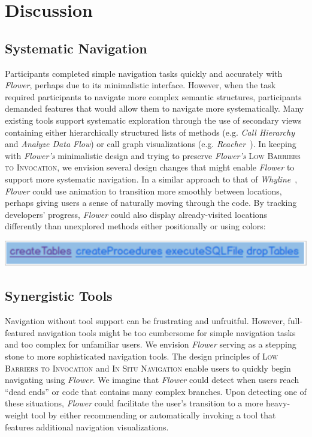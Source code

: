 \documentclass[conference]{IEEEtran}
\begin{document}
\section{Discussion}

\subsection{Systematic Navigation}
Participants completed simple navigation tasks quickly and accurately with \textit{Flower}, perhaps due to its minimalistic interface.
However, when the task required participants to navigate more complex semantic structures, participants demanded features that would allow them to navigate more systematically.
Many existing tools support systematic exploration through the use of secondary views containing either hierarchically structured lists of methods (e.g. \textit{Call Hierarchy} and \textit{Analyze Data Flow}) or call graph visualizations (e.g. \textit{Reacher~\cite{Reacher}}).
In keeping with \textit{Flower's} minimalistic design and trying to preserve \textit{Flower's} \textsc{Low Barriers to Invocation}, we envision several design changes that might enable \textit{Flower}  to support more systematic navigation.
In a similar approach to that of \emph{Whyline}~\cite{Whyline}, \textit{Flower}  could use animation to transition more smoothly between locations, perhaps giving users a sense of naturally moving through the code.
By tracking developers' progress, \textit{Flower} could also display already-visited locations differently than unexplored methods either positionally or using colors:

\noindent\includegraphics[width=\columnwidth]{images/HyperlinkColoring}



\subsection{Synergistic Tools}
Navigation without tool support can be frustrating and unfruitful.
However, full-featured navigation tools might be too cumbersome for simple navigation tasks and too complex for unfamiliar users.
We envision \textit{Flower} serving as a stepping stone to more sophisticated navigation tools. 
The design principles of \textsc{Low Barriers to Invocation} and \textsc{In Situ Navigation} enable users to quickly begin navigating using \textit{Flower}. 
We imagine that \textit{Flower} could detect when users reach ``dead ends'' or code that contains many complex branches.
Upon detecting one of these situations, \textit{Flower} could facilitate the user's transition to a more heavy-weight tool by either recommending or automatically invoking a tool that features additional navigation visualizations.
\end{document}
